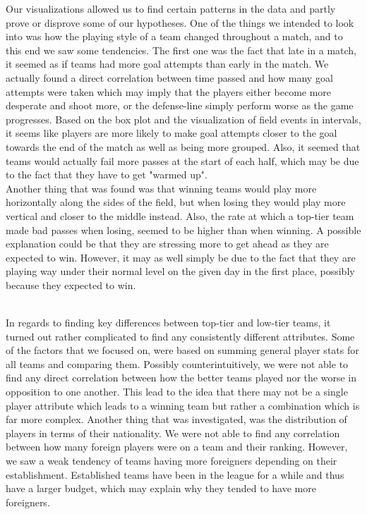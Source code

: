 \documentclass[Report.tex]{subfiles}
\begin{document}
 

Our visualizations allowed us to find certain patterns in the data and partly prove or disprove some of our hypotheses. One of the things we intended to look into was how the playing style of a team changed throughout a match, and to this end we saw some tendencies. The first one was the fact that late in a match, it seemed as if teams had more goal attempts than early in the match. We actually found a direct correlation between time passed and how many goal attempts were taken which may imply that the players either become more desperate and shoot more, or the defense-line simply perform worse as the game progresses. Based on the box plot and the visualization of field events in intervals, it seems like players are more likely to make goal attempts closer to the goal towards the end of the match as well as being more grouped. Also, it seemed that teams would actually fail more passes at the start of each half, which may be due to the fact that they have to get "warmed up".
\\

Another thing that was found was that winning teams would play more horizontally along the sides of the field, but when losing they would play more vertical and closer to the middle instead. Also, the rate at which a top-tier team made bad passes when losing, seemed to be higher than when winning. A possible explanation could be that they are stressing more to get ahead as they are expected to win. However, it may as well simply be due to the fact that they are playing way under their normal level on the given day in the first place, possibly because they expected to win.\\\

In regards to finding key differences between top-tier and low-tier teams, it turned out rather complicated to find any consistently different attributes. Some of the factors that we focused on, were based on summing general player stats for all teams and comparing them. Possibly counterintuitively, we were not able to find any direct correlation between how the better teams played nor the worse in opposition to one another. This lead to the idea that there may not be a single player attribute which leads to a winning team but rather a combination which is far more complex. Another thing that was investigated, was the distribution of players in terms of their nationality. We were not able to find any correlation between how many foreign players were on a team and their ranking. However, we saw a weak tendency of teams having more foreigners depending on their establishment. Established teams have been in the league for a while and thus have a larger budget, which may explain why they tended to have more foreigners. \\
\end{document}
